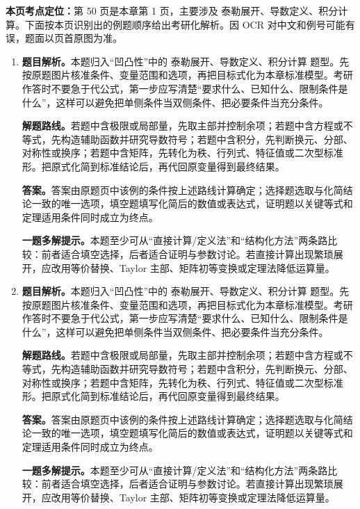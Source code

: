 \begin{solutionblock}
\textbf{本页考点定位：}第 50 页是本章第 1 页，主要涉及 泰勒展开、导数定义、积分计算。下面按本页识别出的例题顺序给出考研化解析。因 OCR 对中文和例号可能有误，题面以页首原图为准。

\begin{enumerate}[label=\textbf{例\arabic*.}, leftmargin=2.4em]

\item \textbf{题目解析。}本题归入“凹凸性”中的 泰勒展开、导数定义、积分计算 题型。先按原题图片核准条件、变量范围和选项，再把目标式化为本章标准模型。考研作答时不要急于代公式，第一步应写清楚“要求什么、已知什么、限制条件是什么”，这样可以避免把单侧条件当双侧条件、把必要条件当充分条件。

\textbf{解题路线。}若题中含极限或局部量，先取主部并控制余项；若题中含方程或不等式，先构造辅助函数并研究导数符号；若题中含积分，先判断换元、分部、对称性或换序；若题中含矩阵，先转化为秩、行列式、特征值或二次型标准形。把原式化简到标准结论后，再代回原变量得到最终结果。

\textbf{答案。}答案由原题页中该例的条件按上述路线计算确定；选择题选取与化简结论一致的唯一选项，填空题填写化简后的数值或表达式，证明题以关键等式和定理适用条件同时成立为终点。

\textbf{一题多解提示。}本题至少可从“直接计算/定义法”和“结构化方法”两条路比较：前者适合填空选择，后者适合证明与参数讨论。若直接计算出现繁琐展开，应改用等价替换、Taylor 主部、矩阵初等变换或定理法降低运算量。

\item \textbf{题目解析。}本题归入“凹凸性”中的 泰勒展开、导数定义、积分计算 题型。先按原题图片核准条件、变量范围和选项，再把目标式化为本章标准模型。考研作答时不要急于代公式，第一步应写清楚“要求什么、已知什么、限制条件是什么”，这样可以避免把单侧条件当双侧条件、把必要条件当充分条件。

\textbf{解题路线。}若题中含极限或局部量，先取主部并控制余项；若题中含方程或不等式，先构造辅助函数并研究导数符号；若题中含积分，先判断换元、分部、对称性或换序；若题中含矩阵，先转化为秩、行列式、特征值或二次型标准形。把原式化简到标准结论后，再代回原变量得到最终结果。

\textbf{答案。}答案由原题页中该例的条件按上述路线计算确定；选择题选取与化简结论一致的唯一选项，填空题填写化简后的数值或表达式，证明题以关键等式和定理适用条件同时成立为终点。

\textbf{一题多解提示。}本题至少可从“直接计算/定义法”和“结构化方法”两条路比较：前者适合填空选择，后者适合证明与参数讨论。若直接计算出现繁琐展开，应改用等价替换、Taylor 主部、矩阵初等变换或定理法降低运算量。

\end{enumerate}
\end{solutionblock}




